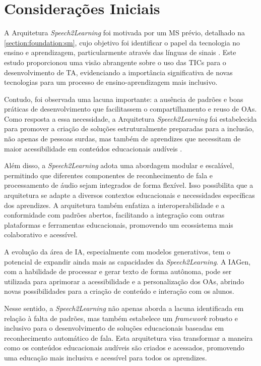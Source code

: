 \section{Considerações Iniciais}

A Arquitetura \textit{Speech2Learning} foi motivada por um MS prévio, detalhado na \autoref{section:foundation:sm}, cujo objetivo foi identificar o papel da tecnologia no ensino e aprendizagem, particularmente através das línguas de sinais \cite{FalvoJr2020_SBIE, FalvoJr2020_FIE, FalvoJr2021_RENOTE}. Este estudo proporcionou uma visão abrangente sobre o uso das TICs para o desenvolvimento de TA, evidenciando a importância significativa de novas tecnologias para um processo de ensino-aprendizagem mais inclusivo.

Contudo, foi observada uma lacuna importante: a ausência de padrões e boas práticas de desenvolvimento que facilitassem o compartilhamento e reuso de OAs. Como resposta a essa necessidade, a Arquitetura \textit{Speech2Learning} foi estabelecida para promover a criação de soluções estruturalmente preparadas para a inclusão, não apenas de pessoas surdas, mas também de aprendizes que necessitam de maior acessibilidade em conteúdos educacionais audíveis \cite{FalvoJr2023_HICSS}.

Além disso, a \textit{Speech2Learning} adota uma abordagem modular e escalável, permitindo que diferentes componentes de reconhecimento de fala e processamento de áudio sejam integrados de forma flexível. Isso possibilita que a arquitetura se adapte a diversos contextos educacionais e necessidades específicas dos aprendizes. A arquitetura também enfatiza a interoperabilidade e a conformidade com padrões abertos, facilitando a integração com outras plataformas e ferramentas educacionais, promovendo um ecossistema mais colaborativo e acessível.

A evolução da área de IA, especialmente com modelos generativos, tem o potencial de expandir ainda mais as capacidades da \textit{Speech2Learning}. A IAGen, com a habilidade de processar e gerar texto de forma autônoma, pode ser utilizada para aprimorar a acessibilidade e a personalização dos OAs, abrindo novas possibilidades para a criação de conteúdo e interação com os alunos.

Nesse sentido, a \textit{Speech2Learning} não apenas aborda a lacuna identificada em relação à falta de padrões, mas também estabelece um \textit{framework} robusto e inclusivo para o desenvolvimento de soluções educacionais baseadas em reconhecimento automático de fala. Esta arquitetura visa transformar a maneira como os conteúdos educacionais audíveis são criados e acessados, promovendo uma educação mais inclusiva e acessível para todos os aprendizes.

